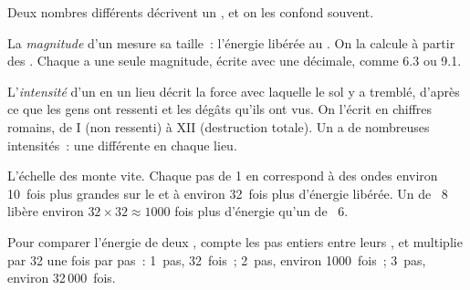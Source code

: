 Deux nombres différents décrivent un , et on les confond souvent.

\begin{definition}[Magnitude]\label{def:g7:earthquakes:magnitude}
La \emph{magnitude} d'un  mesure sa taille~:
l'énergie libérée au . On la calcule à partir des .
Chaque  a une seule magnitude, écrite avec une décimale, comme 6.3
ou 9.1.
\end{definition}

\begin{definition}[Intensité]\label{def:g7:earthquakes:intensity}
L'\emph{intensité} d'un  en un lieu décrit
la force avec laquelle le sol y a tremblé, d'après ce que les gens ont
ressenti et les dégâts qu'ils ont vus. On l'écrit en chiffres romains, de
I (non ressenti) à XII (destruction totale). Un  a de nombreuses
intensités~: une différente en chaque lieu.
\end{definition}

L'échelle des  monte vite. Chaque pas de 1 en 
correspond à des ondes environ 10~fois plus grandes sur le  et
à environ 32~fois plus d'énergie libérée. Un  de ~8 libère
environ $32 \times 32 \approx 1000$ fois plus d'énergie qu'un  de
~6.

\begin{method}\label{met:g7:earthquakes:magnitudes}
Pour comparer l'énergie de deux , compte les pas entiers entre
leurs , et multiplie par 32 une fois par pas~: 1~pas, 32~fois~;
2~pas, environ 1000~fois~; 3~pas, environ 32\,000~fois.
\end{method}

